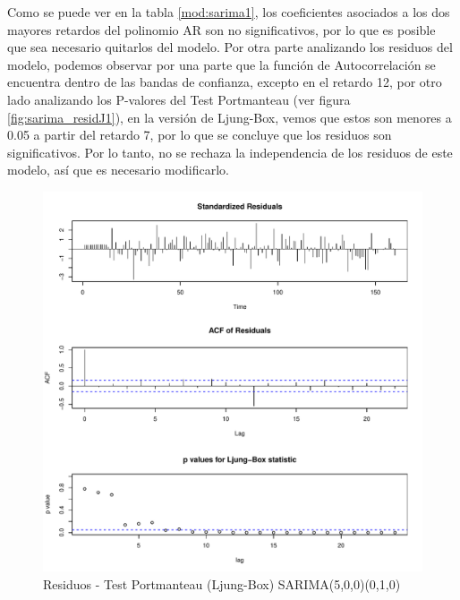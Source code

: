 \documentclass[12pt,oneside]{book}\usepackage[]{graphicx}\usepackage[]{color}
\makeatletter
\def\maxwidth{ %
  \ifdim\Gin@nat@width>\linewidth
    \linewidth
  \else
    \Gin@nat@width
  \fi
}
\newenvironment{knitrout}{}{} %
\theoremstyle{definition} %
\makeatother
\begin{document}
Como se puede ver en la tabla \ref{mod:sarima1}, los coeficientes asociados a los dos mayores retardos del polinomio AR son no significativos, por lo que es posible que sea necesario quitarlos del modelo. Por otra parte analizando los residuos del modelo, podemos observar por una parte que la función de Autocorrelación se encuentra dentro de las bandas de confianza, excepto en el retardo 12, por otro lado analizando los P-valores del Test Portmanteau (ver figura \ref{fig:sarima_residJ1}), en la versión de Ljung-Box, vemos que estos son menores a 0.05 a partir del retardo 7, por lo que se concluye que los residuos son significativos. Por lo tanto, no se rechaza la independencia de los residuos de este modelo, así que es necesario modificarlo.





\begin{knitrout}
\color{fgcolor}\begin{figure}[H]

{\centering \includegraphics[width=\maxwidth]{figure/unnamed-chunk-14-1} 

}

\caption{\label{fig:sarima_residJ1} Residuos - Test Portmanteau (Ljung-Box) SARIMA(5,0,0)(0,1,0)}\label{fig:unnamed-chunk-14}
\end{figure}


\end{knitrout}
\end{document}
